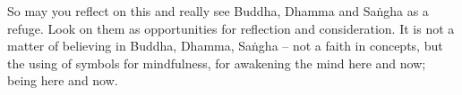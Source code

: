 So may you reflect on this and really see Buddha, Dhamma and Sa\.ngha as a refuge. Look on them as opportunities for reflection and consideration. It is not a matter of believing in Buddha, Dhamma, Sa\.ngha -- not a faith in concepts, but the using of symbols for mindfulness, for awakening the mind here and now; being here and now.
